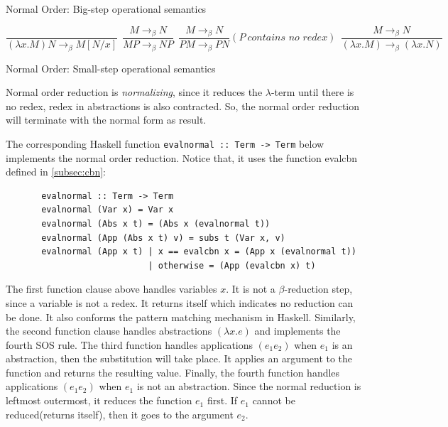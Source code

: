 \documentclass[a4paper,11pt,twoside]{report}
\begin{document}
\begin{center}
Normal Order: Big-step operational semantics
\end{center}

\begin{equation*}
\frac{}{(\lambda x.M)N \rightarrow _\beta M[N/x]}\ \  
\frac{M \rightarrow _\beta N}{MP \rightarrow _\beta NP}\ \ 
\frac{M \rightarrow _\beta N}{PM \rightarrow _\beta PN}(P\ \textit{contains no redex})\ \ 
\frac{M \rightarrow _\beta N}{(\lambda x.M) \rightarrow _\beta (\lambda x.N)}
\end{equation*}
\begin{center}
Normal Order: Small-step operational semantics
\end{center}

Normal order reduction is \textit{normalizing}, since it reduces the $\lambda$-term until there is no redex, redex in abstractions is also contracted. So, the normal order reduction will terminate with the normal form as result. 

The corresponding Haskell function \verb|evalnormal :: Term -> Term| below implements the normal order reduction. Notice that, it uses the function evalcbn defined in \ref{subsec:cbn}:

\begin{verbatim}
       evalnormal :: Term -> Term
       evalnormal (Var x) = Var x
       evalnormal (Abs x t) = (Abs x (evalnormal t))
       evalnormal (App (Abs x t) v) = subs t (Var x, v)
       evalnormal (App x t) | x == evalcbn x = (App x (evalnormal t))
                            | otherwise = (App (evalcbn x) t)
\end{verbatim}

The first function clause above handles variables $x$. It is not a $\beta$-reduction step, since a variable is not a redex. It returns itself which indicates no reduction can be done. It also conforms the pattern matching mechanism in Haskell. Similarly, the second function clause handles abstractions $(\lambda x.e)$ and implements the fourth SOS rule. The third function handles applications $(e_1e_2)$ when $e_1$ is an abstraction, then the substitution will take place. It applies an argument to the function and returns the resulting value. Finally, the fourth function handles  applications $(e_1e_2)$ when $e_1$ is not an abstraction. Since the normal reduction is leftmost outermost, it reduces the function $e_1$ first. If $e_1$ cannot be reduced(returns itself), then it goes to the argument $e_2$. 
\end{document}
